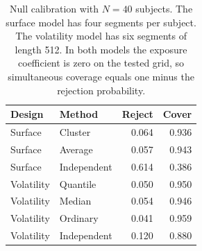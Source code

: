\begin{table}[htbp]
\centering
\caption{Null calibration with $N=40$ subjects. The surface model has four segments per subject. The volatility model has six segments of length 512. In both models the exposure coefficient is zero on the tested grid, so simultaneous coverage equals one minus the rejection probability.}\label{tab:small}
\small
\begin{tabular}{llrr}
\toprule
Design & Method & Reject & Cover \\
\midrule
Surface & Cluster & 0.064 & 0.936 \\
Surface & Average & 0.057 & 0.943 \\
Surface & Independent & 0.614 & 0.386 \\
Volatility & Quantile & 0.050 & 0.950 \\
Volatility & Median & 0.054 & 0.946 \\
Volatility & Ordinary & 0.041 & 0.959 \\
Volatility & Independent & 0.120 & 0.880 \\
\bottomrule
\end{tabular}
\end{table}
